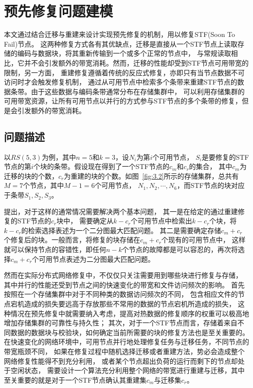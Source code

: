 \section{预先修复问题建模}
本文通过结合迁移与重建来设计实现预先修复的机制，用以修复STF(Soon To Fail)\cite{shen2019fast}节点。
这两种修复方式各有其优缺点，迁移是直接从一个STF节点上读取存储的编码与数据块，将其重新传输到一个或多个正常的节点中，
与常规读取相比，它并不会引发额外的带宽消耗。然而，迁移的性能却受到STF节点可用带宽的限制，另一方面，
重建修复遵循着传统的反应式修复，亦即只有当节点数据不可访问时才会触发修复机制，
通过从可用节点中检索多个条带来重建STF节点的数据条带。由于这些数据与编码条带通常分布在存储集群中，
可以利用存储集群的可用带宽资源，让所有可用节点以并行的方式参与STF节点的多个条带的修复，但是会引发额外的带宽消耗。

\subsection{问题描述}

以$RS(5,3)$为例，其中$n=5$和$k=3$，设$N_i$为第$i$个可用节点， 
$S_i$是要修复的STF节点的第$i$个块的条带。假设现在得到了一个STF节点的$c_m$和$c_r$的集合，
其中$c_m$为迁移的块的个数，$c_r$为重建的块的个数。如图~\ref{fig:3.2}所示的存储集群，总共有$M=7$个节点，其中$M-1=6$个可用节点，
$N_1,N_2,\cdots,N_6$，而STF节点的块对应于条带$S_1,S_2,S_3$。


\citet{shen2019fast}提出，对于这样的通常情况需要解决两个基本问题，
其一是在给定的通过重建修复的STF节点的$c_r$块中，
需要确定从$k-c_r$个可用节点中检索出$k-c_r$个块，将$k-c_r$的检索选择表述为一个二分图最大匹配问题。
其二是需要确定存储$c_m+c_r$个修复后的块。一般而言，将修复的块存储在$c_m+c_r$个现有的可用节点中，
这样就可以保持节点的容错性，即任何$n-k$个节点的故障都是可以容忍的，再次将选择$c_m+c_r$个可用节点表述为二分图最大匹配问题。

然而在实际分布式网络修复中，不仅仅只关注需要用到哪些块进行修复与存储，
其中并行的性能还受到节点之间的快速变化的带宽和文件访问频次的影响。
首先按照在一个存储集群中对于不同种类的数据访问频次的不同，
包含相应文件的节点宕机造成的损失要远高于存放那些不常用的数据的节点宕机所造成的损失，
这种情况在预先修复中就需要纳入考虑，提高对热数据的修复顺序的权重可以极高地增加存储集群的可靠性与持久性；
其次，对于一个STF节点而言，存储着来自不同数据的数据块与校验块，如何确定当前所需要的块的修复方法也是至关重要的。
在快速变化的网络环境中，可用节点并行地处理修复任务与迁移任务，不同节点的带宽瓶颈不同，
如果在修复过程中随机选择迁移或者重建方法，势必会造成整个网络修复性能得不到充分利用，
或者某个节点超出负荷的运行而剩下的节点却处于空闲状态，
需要设计一个算法充分利用整个网络的带宽进行重建与迁移，其中至关重要的就是对于一个STF节点确认其重建集$c_m$与迁移集$c_r$。 

